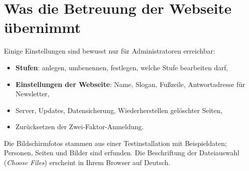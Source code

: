 \documentclass[a4paper,fontsize=10pt]{scrartcl}
\begin{document}
\section{Was die Betreuung der Webseite übernimmt}

Einige Einstellungen sind bewusst nur für Administratoren erreichbar:

\begin{itemize}
  \item \textbf{Stufen}: anlegen, umbenennen, festlegen, welche Stufe bearbeiten darf,
  \item \textbf{Einstellungen der Webseite}: Name, Slogan, Fußzeile,
        Antwortadresse für Newsletter,
  \item Server, Updates, Datensicherung, Wiederherstellen gelöschter Seiten,
  \item Zurücksetzen der Zwei-Faktor-Anmeldung.
\end{itemize}

{\small\color{dsgrau} Die Bildschirmfotos stammen aus einer Testinstallation
mit Beispieldaten; Personen, Seiten und Bilder sind erfunden. Die Beschriftung
der Dateiauswahl (\emph{Choose Files}) erscheint in Ihrem Browser auf Deutsch.}
\end{document}
